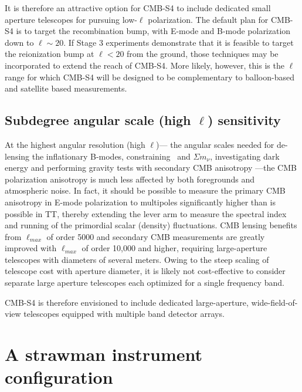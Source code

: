 It is therefore an attractive option for CMB-S4 to include dedicated small aperture telescopes for pursuing low-$\ell$ polarization. The default plan for CMB-S4 is to target the recombination bump, with E-mode and B-mode polarization down to $\ell \sim 20$. If Stage 3 experiments demonstrate that it is feasible to target the reionization bump at $\ell < 20$ from the ground, those techniques may be incorporated to extend the reach of CMB-S4. More likely, however, this is the $\ell$ range for which CMB-S4 will be designed to be complementary to balloon-based and satellite based measurements. 

\subsection{Subdegree angular scale (high $\ell$) sensitivity}

At the highest angular resolution (high $\ell$)--- the angular scales needed for de-lensing the inflationary B-modes, constraining \neff\ and $\Sigma m_\nu$,  investigating dark energy and performing gravity tests with secondary CMB  anisotropy ---the CMB polarization anisotropy is much less affected by both foregrounds and atmospheric noise. In fact, it should be possible to measure the primary CMB anisotropy in E-mode polarization to multipoles significantly higher than is possible in TT, thereby extending the lever arm to measure the spectral index and running of the primordial scalar (density) fluctuations. CMB lensing benefits from $\ell_{max}$ of order 5000 and secondary CMB measurements are greatly improved with $\ell_{max}$ of order 10,000 and higher, requiring large-aperture telescopes with diameters of several meters. Owing to the steep scaling of telescope cost with aperture diameter, it is likely not cost-effective to consider separate large aperture telescopes each optimized for a single frequency band. 

CMB-S4 is therefore envisioned to include dedicated large-aperture, wide-field-of-view telescopes equipped with multiple band detector arrays.

\section{A strawman instrument configuration}
\label{sec:strawman}

